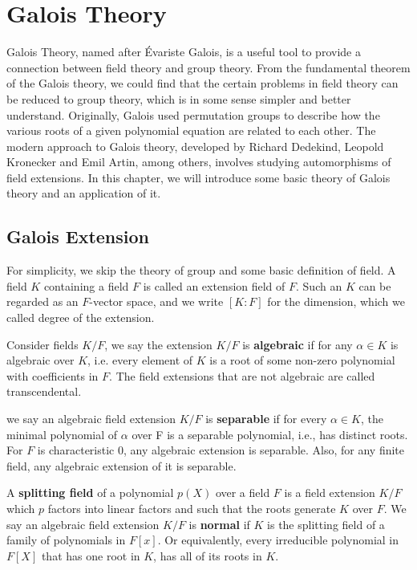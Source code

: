 \chapter{Galois Theory}
\label{chap:chap-three}
Galois Theory, named after \'{E}variste Galois, is a useful tool to provide a connection between field theory and group theory. From the fundamental theorem of the Galois theory, we could find that the certain problems in field theory can be reduced to group theory, which is in some sense simpler and better understand. Originally, Galois used permutation groups to describe how the various roots of a given polynomial equation are related to each other. The modern approach to Galois theory, developed by Richard Dedekind, Leopold Kronecker and Emil Artin, among others, involves studying automorphisms of field extensions. In this chapter, we will introduce some basic theory of Galois theory and an application of it.


\section{Galois Extension}
For simplicity, we skip the theory of group and some basic definition of field. A field $K$ containing a field $F$ is called an extension field of $F$. Such an $K$ can be regarded as an $F$-vector space, and we write $[K:F]$ for the dimension, which we called degree of the extension. 

Consider fields $K/F$, we say the extension $K/F$ is \textbf{algebraic} if for any $\alpha\in K$ is algebraic over $K$, i.e.  every element of $K$ is a root of some non-zero polynomial with coefficients in $F$. The field extensions that are not algebraic are called transcendental.  

we say an algebraic field extension $K/F$ is \textbf{separable} if for every $\alpha\in K$, the minimal polynomial of $\alpha$ over F is a separable polynomial, i.e., has distinct roots. For $F$ is characteristic $0$, any algebraic extension is separable. Also, for any finite field, any algebraic extension of it is separable. 

A \textbf{splitting field} of a polynomial $p(X)$ over a field $F$ is a field extension $K/F$ which $p$ factors into linear factors and such that the roots generate $K$ over $F$. We say an algebraic field extension $K/F$ is \textbf{normal} if $K$ is the splitting field of a family of polynomials in $F[x]$. Or equivalently, every irreducible polynomial in $F[X]$ that has one root in $K$, has all of its roots in $K$.

